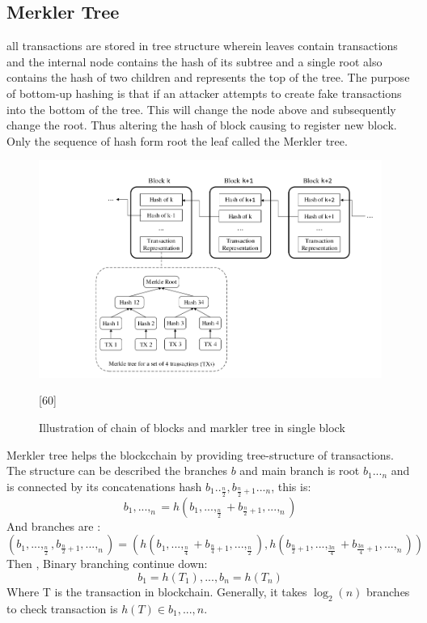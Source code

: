 \subsection{Merkler Tree}
all transactions are stored in tree structure wherein leaves contain transactions and the internal node contains the hash of its subtree and a single root also contains the hash of two children and represents the top of the tree. The purpose of bottom-up hashing is that if an attacker attempts to create fake transactions into the bottom of the tree. This will change the node above and subsequently change the root. Thus altering the hash of block causing to register new block. Only the sequence of hash form root the leaf called the Merkler tree\cite{Vitalik}.   
\begin{center}
	\begin{figure}[htb!]
		
		\begin{minipage}{0.55\linewidth}
			\centering
			\includegraphics[width=1.85\textwidth]{images/chap01_Markler_tree.png}
		\end{minipage}
		\caption{Illustration of chain of blocks and  markler tree in single block}{[60]}
		
		
	\end{figure}
	
\end{center}
Merkler tree helps the blockcchain by providing tree-structure of transactions. The structure can be described the branches $b$ and main branch is root $b_1..._n$ and is connected by its concatenations hash $b_1.._{\frac{n}{2}}, b_{\frac{n}{2}+1}..._n$, this is:\\
\[b_1,...,_n=h(b_1,...,_{\frac{n}{2}}+ b_{\frac{n}{2}+1},...,_n) \]
And branches are :
\[ (b_1,...,_{\frac{n}{2}}, b_{\frac{n}{2}+1},...,_n)=(h(b_1,...,_{\frac{n}{4}}+ b_{\frac{n}{4}+1},...,_\frac{n}{2}) , h(b_{\frac{n}{2}+1},...,_{\frac{3n}{4}}+ b_{\frac{3n}{4}+1},...,_n))\]
Then , Binary branching continue down:
\[ b_1=h(T_1),...,b_n=h(T_n)   \]
Where T is the transaction in blockchain. Generally, it takes $\log_2(n)$ branches to check transaction is $h(T)\in b_1,...,n$\cite{Kevin}.


